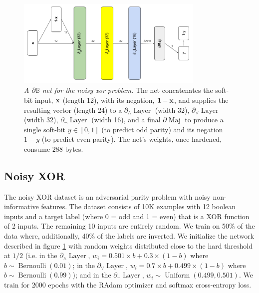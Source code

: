 \documentclass{article} %
\begin{document}
\begin{figure}[t!]
	\centering
	\includegraphics[width=0.8\textwidth]{noisy-xor-architecture.png}
	\caption{{\em A $\partial\mathbb{B}$ net for the noisy xor problem}. The net concatenates the soft-bit input, ${\bf x}$ (length 12), with its negation, ${\bf 1 - x}$, and supplies the resulting vector (length 24) to a $\partial_{\wedge}\!\!\operatorname{Layer}$ (width 32), $\partial_{\vee}\!\!\operatorname{Layer}$ (width 32),  $\partial_{\neg} \!\operatorname{Layer}$ (width 16), and a final $\partial\!\operatorname{Maj}$ to produce a single soft-bit $y \in [0,1]$ (to predict odd parity) and its negation $1-y$ (to predict even parity). The net's weights, once hardened, consume $288$ bytes.}
	\label{fig:noisy-xor-architecture}
\end{figure}

\subsection{Noisy XOR}

The noisy XOR dataset \citep{noisy-xor-dataset} is an adversarial parity problem with noisy non-informative features. The dataset consists of 10K examples with 12 boolean inputs and a target label (where 0 = odd and 1 = even) that is a XOR function of 2 inputs. The remaining 10 inputs are entirely random. We train on 50\% of the data where, additionally, 40\% of the labels are inverted. We initialize the network described in figure \ref{fig:noisy-xor-architecture} with random weights distributed close to the hard threshold at $1/2$ (i.e. in the $\partial_{\wedge}\!\operatorname{Layer}$, $w_{i} = 0.501 \times b + 0.3 \times (1-b)$ where $b \sim \operatorname{Bernoulli}(0.01)$; in the $\partial_{\vee}\!\operatorname{Layer}$, $w_{i} = 0.7 \times b + 0.499 \times (1-b)$ where $b \sim \operatorname{Bernoulli}(0.99)$); and in the $\partial_{\neg}\!\operatorname{Layer}$, $w_{i} \sim \operatorname{Uniform}(0.499, 0.501)$. We train for 2000 epochs with the RAdam optimizer and softmax cross-entropy loss. 
\end{document}
